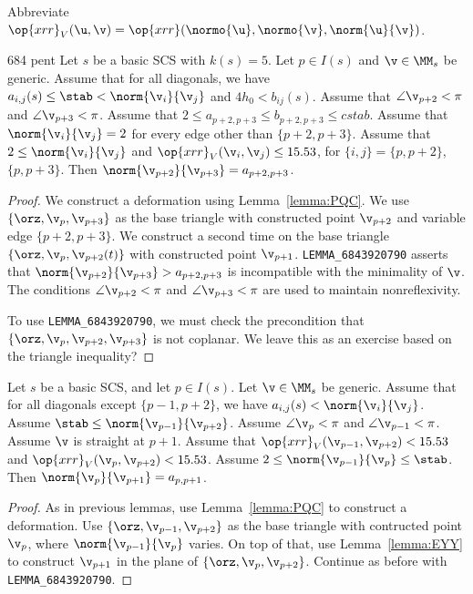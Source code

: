 Abbreviate $\op{xrr}_V (\u,\v) = \op{xrr} (\normo{\u},\normo{\v},\norm{\u}{\v})$.

\begin{lemma}{684 pent}\label{lemma:684-pent}
Let $s$ be a basic SCS with $k(s)=5$.  Let $p\in I(s)$ and $\v\in \MM_s$ be generic.
Assume that for all diagonals, we have $a_{i,j}(s) \le \stab <\norm{\v_i}{\v_j}$ 
and $4h_0 < b_{ij}(s)$.
Assume that $\angle \v_{p+2} < \pi$ and $\angle \v_{p+3} < \pi$.
Assume that $2\le a_{p+2,p+3} \le b_{p+2,p+3} \le cstab$.
Assume that $\norm{\v_i}{\v_j}=2$ for every edge other than $\{p+2,p+3\}$.
Assume that $2\le \norm{\v_i}{\v_j}$ and $\op{xrr}_V(\v_i,\v_j)\le 15.53$, 
for $\{i,j\} = \{p,p+2\}$, $\{p,p+3\}$.
Then $\norm{\v_{p+2}}{\v_{p+3}} = a_{p+2,p+3}$.
\end{lemma}

\begin{proof} We construct a deformation using Lemma~\ref{lemma:PQC}.  We use $\{\orz,\v_p,\v_{p+3}\}$ as
the base triangle with constructed point $\v_{p+2}$ and variable edge $\{p+2,p+3\}$.  We construct a second
time on the base triangle $\{\orz,\v_p,\v_{p+2}(t)\}$ with constructed point $\v_{p+1}$.
{\tt LEMMA\_6843920790} asserts that $\norm{\v_{p+2}}{\v_{p+3}} > a_{p+2,p+3}$ is incompatible with the minimality of $\v$.
The conditions  $\angle \v_{p+2} < \pi$ and $\angle \v_{p+3} < \pi$ 
are used to maintain nonreflexivity.

To use {\tt LEMMA\_6843920790}, we must check the precondition that $\{\orz,\v_p,\v_{p+2},\v_{p+3}\}$
is not coplanar.  We leave this as an exercise based on the triangle inequality?
\end{proof}

\begin{lemma}[684 str]\label{lemma:684 str}
Let $s$ be a basic SCS, and let $p\in I(s)$.  Let $\v\in \MM_s$ be generic.
Assume that for all diagonals except $\{p-1,p+2\}$,
we have $a_{i,j}(s)<\norm{\v_i}{\v_j}$.  
Assume $\stab \le \norm{\v_{p-1}}{\v_{p+2}}$.
Assume $\angle \v_p < \pi$ and $\angle \v_{p-1} < \pi$.
Assume $\v$ is straight at $p+1$.
Assume that $\op{xrr}_V(\v_{p-1},\v_{p+2})<15.53$ and $\op{xrr}_V(\v_p,\v_{p+2})< 15.53$.
Assume $2\le  \norm{\v_{p-1}}{\v_{p}}\le \stab$.
Then $\norm{\v_p}{\v_{p+1}} = a_{p,p+1}$.
\end{lemma}

\begin{proof} As in previous lemmas, use Lemma~\ref{lemma:PQC} to construct a deformation.
Use $\{\orz,\v_{p-1},\v_{p+2}\}$ as the base triangle with contructed point $\v_p$, where $\norm{\v_{p-1}}{\v_p}$ varies.
On top of that, use Lemma~\ref{lemma:EYY} to construct $\v_{p+1}$ in the plane of $\{\orz,\v_p,\v_{p+2}\}$.
Continue as before with  {\tt LEMMA\_6843920790}.
\end{proof}

